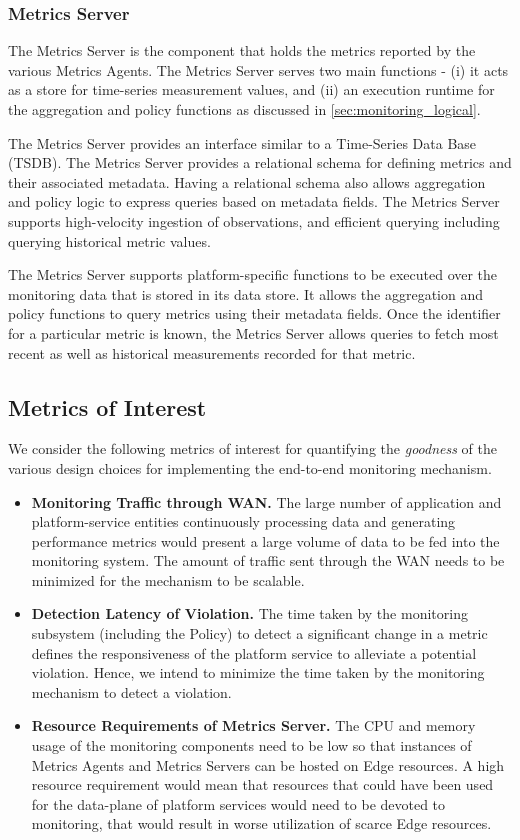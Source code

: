 \subsubsection{Metrics Server}
The Metrics Server is the component that holds the metrics reported by the various Metrics Agents. The Metrics Server serves two main functions - (i) it acts as a store for time-series measurement values, and (ii) an execution runtime for the aggregation and policy functions as discussed in \cref{sec:monitoring_logical}. 
\par The Metrics Server provides an interface similar to a Time-Series Data Base (TSDB). The Metrics Server provides a relational schema for defining metrics and their associated metadata. Having a relational schema also allows aggregation and policy logic to express queries based on metadata fields. The Metrics Server supports high-velocity ingestion of observations, and efficient querying including querying historical metric values.
\par The Metrics Server supports platform-specific functions to be executed over the monitoring data that is stored in its data store. It allows the aggregation and policy functions to query metrics using their metadata fields. Once the identifier for a particular metric is known, the Metrics Server allows queries to fetch most recent as well as historical measurements recorded for that metric.

\subsection{Metrics of Interest}
We consider the following metrics of interest for quantifying the \textit{goodness} of the various design choices for implementing the end-to-end monitoring mechanism.
\begin{itemize}
\item \textbf{Monitoring Traffic through WAN. } The large number of application and platform-service entities continuously processing data and generating performance metrics would present a large volume of data to be fed into the monitoring system. The amount of traffic sent through the WAN needs to be minimized for the mechanism to be scalable.
\item \textbf{Detection Latency of Violation. }The time taken by the monitoring subsystem (including the Policy) to detect a significant change in a metric defines the responsiveness of the platform service to alleviate a potential violation. Hence, we intend to minimize the time taken by the monitoring mechanism to detect a violation.
\item \textbf{Resource Requirements of Metrics Server. } The CPU and memory usage of the monitoring components need to be low so that instances of Metrics Agents and Metrics Servers can be hosted on Edge resources. A high resource requirement would mean that resources that could have been used for the data-plane of platform services would need to be devoted to monitoring, that would result in worse utilization of scarce Edge resources.
\end{itemize}


